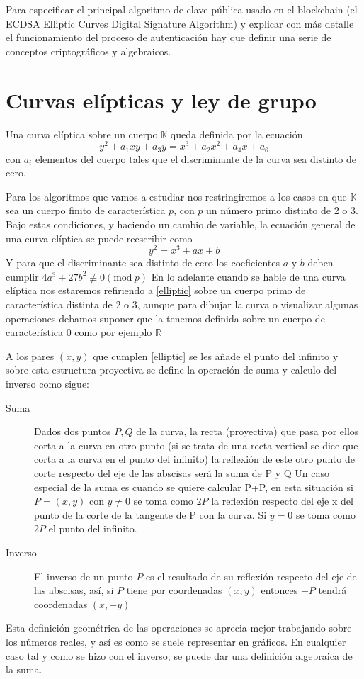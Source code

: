 Para especificar el principal algoritmo de clave pública usado en el blockchain (el ECDSA Elliptic Curves Digital Signature Algorithm) y explicar con más detalle el funcionamiento del proceso de autenticación hay que definir una serie de conceptos criptográficos y algebraicos. 
\section{Curvas elípticas y ley de grupo}\label{curvas_grupo}
\theoremstyle{definition}\begin{definition}\label{curv_ellipt}
Una curva elíptica sobre un cuerpo $\mathbb{K}$ queda definida por la ecuación \[y^2 +a_1xy+a_3 y = x^3 +a_2x^2 +a_4x +a_6\] con $a_i$ elementos del cuerpo tales que el discriminante de la curva sea distinto de cero.\end{definition} Para los algoritmos que vamos a estudiar nos restringiremos a los casos en que $\mathbb{K}$ sea un cuerpo finito de característica $p$, con $p$ un número primo distinto de 2 o 3. Bajo estas condiciones, y haciendo un cambio de variable, la ecuación general de una curva elíptica se puede reescribir como \begin{equation} \label{elliptic}y^2 = x^3 + ax + b \end{equation} Y para que el discriminante sea distinto de cero los coeficientes $a$ y $b$ deben cumplir $4a^3 + 27b^2 \not\equiv 0(\textrm{mod}\ p)$ En lo adelante cuando se hable de una curva elíptica nos estaremos refiriendo a \ref{elliptic} sobre un cuerpo primo de característica distinta de 2 o 3, aunque para dibujar la curva o visualizar algunas operaciones debamos suponer que la tenemos definida sobre un cuerpo de característica 0 como por ejemplo $\mathbb{R}$

A los pares $(x,y)$ que cumplen \ref{elliptic} se les añade el punto del infinito y sobre esta estructura proyectiva se define la operación de suma y calculo del inverso como sigue:
\begin{description}
\item [Suma]
Dados dos puntos $P, Q$ de la curva, la recta (proyectiva) que pasa por ellos corta a la curva en otro punto (si se trata de una recta vertical se dice que corta a la curva en el punto del infinito) la reflexión de este otro punto de corte respecto del eje de las abscisas será la suma de P y Q
Un caso especial de la suma es cuando se quiere calcular P+P, en esta situación si $P =(x,y)$ con $y \not= 0$ se toma como $2P$ la reflexión respecto del eje x del punto de la corte de la tangente de P con la curva. Si $y = 0$ se toma como $2P$ el punto del infinito.
\item [Inverso]
 El inverso de un punto $P$ es el resultado de su reflexión respecto del eje de las abscisas, así, si $P$ tiene por coordenadas $(x,y)$ entonces $-P$ tendrá coordenadas $(x,-y)$
\end{description}%
Esta definición geométrica de las operaciones se aprecia mejor trabajando sobre los números reales, y así es como se suele representar en gráficos. En cualquier caso tal y como se hizo con el inverso, se puede dar una definición algebraica de la suma.


